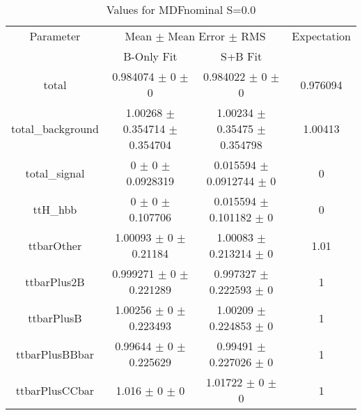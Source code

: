 \begin{table}
\centering
\caption{Values for MDFnominal S=0.0}
\begin{tabular}{cccc}
\toprule
Parameter & \multicolumn{2}{c}{Mean $\pm$ Mean Error $\pm$ RMS} & Expectation\\
 & B-Only Fit & S+B Fit & \\
\midrule
total & \num{0.984074} $\pm$ \num{0} $\pm$ \num{0} & \num{0.984022} $\pm$ \num{0} $\pm$ \num{0} & \num{0.976094}\\
total\_background & \num{1.00268} $\pm$ \num{0.354714} $\pm$ \num{0.354704} & \num{1.00234} $\pm$ \num{0.35475} $\pm$ \num{0.354798} & \num{1.00413}\\
total\_signal & \num{0} $\pm$ \num{0} $\pm$ \num{0.0928319} & \num{0.015594} $\pm$ \num{0.0912744} $\pm$ \num{0} & \num{0}\\
ttH\_hbb & \num{0} $\pm$ \num{0} $\pm$ \num{0.107706} & \num{0.015594} $\pm$ \num{0.101182} $\pm$ \num{0} & \num{0}\\
ttbarOther & \num{1.00093} $\pm$ \num{0} $\pm$ \num{0.21184} & \num{1.00083} $\pm$ \num{0.213214} $\pm$ \num{0} & \num{1.01}\\
ttbarPlus2B & \num{0.999271} $\pm$ \num{0} $\pm$ \num{0.221289} & \num{0.997327} $\pm$ \num{0.222593} $\pm$ \num{0} & \num{1}\\
ttbarPlusB & \num{1.00256} $\pm$ \num{0} $\pm$ \num{0.223493} & \num{1.00209} $\pm$ \num{0.224853} $\pm$ \num{0} & \num{1}\\
ttbarPlusBBbar & \num{0.99644} $\pm$ \num{0} $\pm$ \num{0.225629} & \num{0.99491} $\pm$ \num{0.227026} $\pm$ \num{0} & \num{1}\\
ttbarPlusCCbar & \num{1.016} $\pm$ \num{0} $\pm$ \num{0} & \num{1.01722} $\pm$ \num{0} $\pm$ \num{0} & \num{1}\\
\bottomrule
\end{tabular}
\end{table}